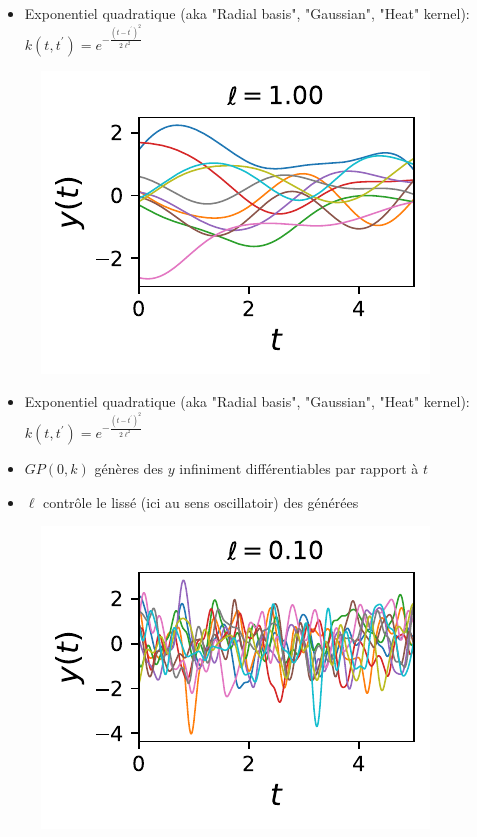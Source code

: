 \documentclass[xcolor=svgnames, t]{beamer}
\begin{document}
\begin{frame}{\subsecname}
  
  \begin{itemize}
    \item Exponentiel quadratique (aka "Radial basis", "Gaussian", "Heat" kernel):
    $k (t, t^\prime) = e^{- \frac{(t - t^\prime)^2}{2 \ell^2} }$
  \end{itemize}
  \begin{figure}
    \includegraphics{10_gp_time_SquaredExponentialKernel_1.00.pdf}
  \end{figure}
\end{frame}

\begin{frame}{\subsecname}
  
  \begin{itemize}
    \item Exponentiel quadratique (aka "Radial basis", "Gaussian", "Heat" kernel):
    $k (t, t^\prime) = e^{- \frac{(t - t^\prime)^2}{2 \ell^2} }$
    \item $GP (0, k)$ génères des $y$ infiniment différentiables par rapport à $t$
    \item \implies $\ell$ contrôle le lissé (ici au sens oscillatoir) des générées
  \end{itemize}
  \begin{figure}
    \includegraphics{10_gp_time_SquaredExponentialKernel_0.10.pdf}
  \end{figure}
\end{frame}
\end{document}
